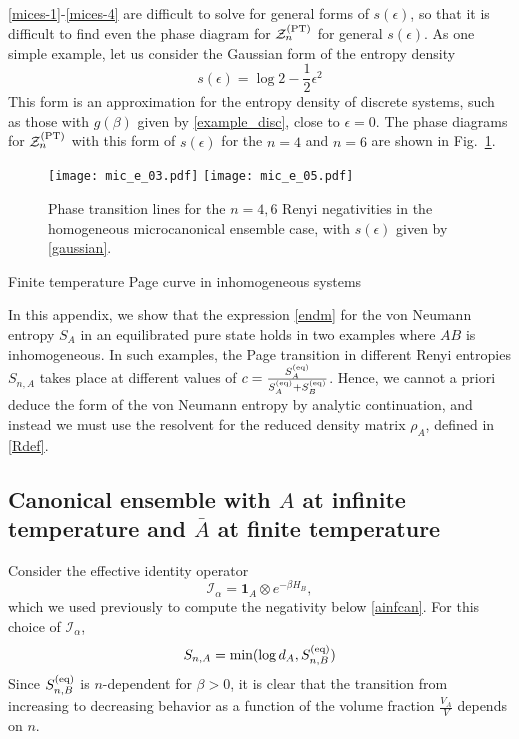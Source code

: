 \documentclass[a4paper,11pt]{article}
\newcommand{\be}{\begin{equation}}
\newcommand{\ee}{\end{equation}}
\newcommand\al{{\alpha}}
\newcommand\sI{{\ensuremath{{\mathcal I}}}}
\newcommand\sZ{{\mathcal Z}}
\begin{document}
\begin{enumerate}
\begin{appendix}
\eqref{mices-1}-\eqref{mices-4} are difficult to solve for general forms of $s(\epsilon)$, so that it is difficult to find even the phase diagram for $\sZ_n^{\rm (PT)}$ for general $s(\epsilon)$. As one simple example, let us consider the Gaussian form of the entropy density
 \be 
 s(\epsilon) = \log 2 - \frac{1}{2} \epsilon^2 \label{gaussian}
 \ee
This form is an approximation for the entropy density of discrete systems, such as those with $g(\beta)$ given by \eqref{example_disc}, close to $\epsilon = 0$. The phase diagrams for $\sZ_n^{\rm (PT)}$ with this form of $s(\epsilon)$ for the $n=4$ and $n=6$ are shown in Fig.~\ref{fig:gaussian_mc}. 
 
 \begin{figure}[]
\centering 
\texttt{[image: mic\_e\_03.pdf]} 
\texttt{[image: mic\_e\_05.pdf]} 
\caption{Phase transition lines for the $n=4, 6$ Renyi negativities in the homogeneous microcanonical ensemble case, with $s(\epsilon)$ given by \eqref{gaussian}.}
\label{fig:gaussian_mc}
\end{figure}


\begin{section}{Finite temperature Page curve in inhomogeneous systems}
\label{app:page_finite}

In this appendix, we show that the expression \eqref{endm} for the von Neumann entropy $S_A$ in an equilibrated pure state holds in two examples where $AB$ is inhomogeneous. In such examples, the Page transition in different Renyi entropies $S_{n,A}$ takes place at different values of $c = \frac{S^{\rm(eq)}_A}{S^{\rm(eq)}_A+S^{\rm(eq)}_{B}}$. Hence, we cannot a priori deduce the form of the von Neumann entropy by analytic continuation, and instead we must use the resolvent for the reduced density matrix $\rho_A$, defined in \eqref{Rdef}. 

\subsection{Canonical ensemble with $A$ at infinite temperature and $\bar A$ at finite temperature}

Consider the effective identity operator 
\be 
\sI_{\al} = \mathbf{1}_A \otimes e^{-\beta H_{B}}, \label{ainf_n}
\ee
which we used previously to compute the negativity below \eqref{ainfcan}. For this choice of $\sI_{\al}$, 
\be 
S_{n, A} = \text{min}(\log d_A, S^{\rm (eq)}_{n, B}) \label{Renyi_inf}
\ee
Since $S^{\rm (eq)}_{n, B}$ is $n$-dependent for $\beta>0$, it is clear that the transition from increasing to decreasing behavior as a function of the volume fraction $\frac{V_A}{V}$ depends on $n$. 


\end{section}
\end{appendix}
\end{enumerate}
\end{document}
